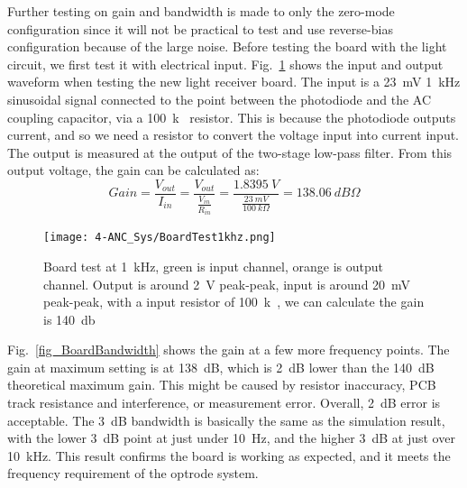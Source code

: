 Further testing on gain and bandwidth is made to only the zero-mode configuration since it will not be practical to test and use reverse-bias configuration because of the large noise.  Before testing the board with the light circuit, we first test it with electrical input.  Fig.~\ref{fig_BoardTest1khz} shows the input and output waveform when testing the new light receiver board.  The input is a \qty{23}{mV} \qty{1}{kHz} sinusoidal signal connected to the point between the photodiode and the AC coupling capacitor, via a \qty{100}{k\Omega} resistor.  This is because the photodiode outputs current, and so we need a resistor to convert the voltage input into current input.  The output is measured at the output of the two-stage low-pass filter.  From this output voltage, the gain can be calculated as:
$$Gain=\frac{V_{out}}{I_{in}}=\frac{V_{out}}{\frac{V_{in}}{R_{in}}}=\frac{\qty{1.8395}{V}}{\frac{\qty{23}{mV}}{\qty{100}{k\Omega}}}=\qty{138.06}{dB\Omega}$$

\begin{figure}[H]
\centering
\texttt{[image: 4-ANC\_Sys/BoardTest1khz.png]}
\caption{Board test at \qty{1}{kHz}, green is input channel, orange is output channel.  Output is around \qty{2}{V} peak-peak, input is around \qty{20}{mV} peak-peak, with a input resistor of \qty{100}{k\Omega}, we can calculate the gain is \qty{140}{db\Omega}}
\label{fig_BoardTest1khz}
\end{figure}

Fig.~\ref{fig_BoardBandwidth} shows the gain at a few more frequency points.  The gain at maximum setting is at \qty{138}{dB}, which is \qty{2}{dB} lower than the \qty{140}{dB} theoretical maximum gain.  This might be caused by resistor inaccuracy, PCB track resistance and interference, or measurement error.  Overall, \qty{2}{dB} error is acceptable.  The \qty{3}{dB} bandwidth is basically the same as the simulation result, with the lower \qty{3}{dB} point at just under \qty{10}{Hz}, and the higher \qty{3}{dB} at just over \qty{10}{kHz}.  This result confirms the board is working as expected, and it meets the frequency requirement of the optrode system.

